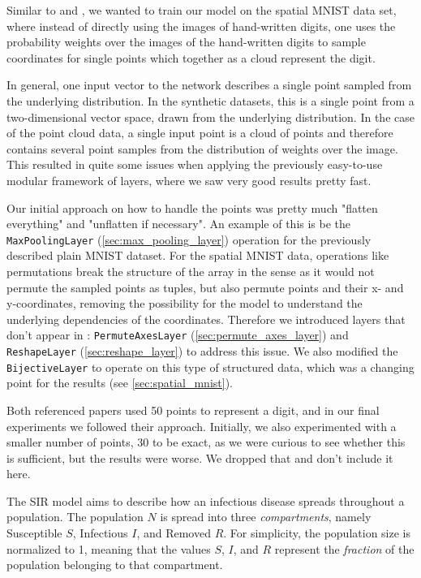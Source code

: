 
Similar to \cite{nielsen2020survae} and \cite{edwards2017neural}, we wanted to train our model on the spatial MNIST data set, where instead of directly using the images of hand-written digits, one uses the probability weights over the images of the hand-written digits to sample coordinates for single points which together as a cloud represent the digit.

In general, one input vector to the network describes a single point sampled from the underlying distribution. In the synthetic datasets, this is a single point from a two-dimensional vector space, drawn from the underlying distribution. In the case of the point cloud data, a single input point is a cloud of points and therefore contains several point samples from the distribution of weights over the image. This resulted in quite some issues when applying the previously easy-to-use modular framework of layers, where we saw very good results pretty fast.

Our initial approach on how to handle the points was pretty much "flatten everything" and "unflatten if necessary". An example of this is be the \texttt{MaxPoolingLayer} (\ref{sec:max_pooling_layer}) operation for the previously described plain MNIST dataset. For the spatial MNIST data, operations like permutations break the structure of the array in the sense as it would not permute the sampled points as tuples, but also permute points and their x- and y-coordinates, removing the possibility for the model to understand the underlying dependencies of the coordinates. Therefore we introduced layers that don't appear in \cite{nielsen2020survae}: \texttt{PermuteAxesLayer} (\ref{sec:permute_axes_layer}) and \texttt{ReshapeLayer} (\ref{sec:reshape_layer}) to address this issue. We also modified the \texttt{BijectiveLayer} to operate on this type of structured data, which was a changing point for the results (see \ref{sec:spatial_mnist}).

Both referenced papers used 50 points to represent a digit, and in our final experiments we followed their approach. Initially, we also experimented with a smaller number of points, 30 to be exact, as we were curious to see whether this is sufficient, but the results were worse. We dropped that and don't include it here. 

\label{sec:sir_data}
The SIR model aims to describe how an infectious disease spreads throughout a population. The population $N$ is spread into three \textit{compartments}, namely Susceptible $S$, Infectious $I$, and Removed $R$. For simplicity, the population size is normalized to 1, meaning that the values $S$, $I$, and $R$ represent the \textit{fraction} of the population belonging to that compartment.

